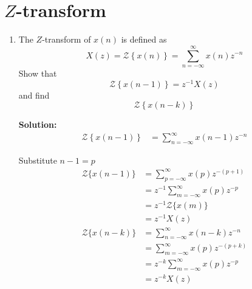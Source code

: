 \documentclass[journal,12pt,twocolumn]{IEEEtran}
\newcommand{\solution}{\noindent \textbf{Solution: }}
\providecommand{\brak}[1]{\ensuremath{\left(#1\right)}}
\providecommand{\cbrak}[1]{\ensuremath{\left\{#1\right\}}}
\numberwithin{equation}{section}
\renewcommand\thesection{\arabic{section}}
\begin{document}
	\section{$Z$-transform}
	\begin{enumerate}[label=\thesection.\arabic*]
	\item The $Z$-transform of $x\brak{n}$ is defined as
	\begin{equation}
		X\brak{z}={\mathcal{Z}}\cbrak{x\brak{n}}=\sum _{n=-\infty }^{\infty }x(n)z^{-n}
	\end{equation}
	Show that
	\begin{equation}
		{\mathcal{Z}}\cbrak{x\brak{n-1}} = z^{-1}X\brak{z}
	\end{equation}
	and find
	\begin{equation}
		{\mathcal{Z}}\cbrak{x\brak{n-k}}
	\end{equation}
	
	\solution 
	\begin{align}
		{\mathcal{Z}}\cbrak{x\brak{n-1}} &= \sum _{n=-\infty }^{\infty }x\brak{n-1}z^{-n} 
	\end{align}
	
	Substitute $n - 1 = p$
	\begin{align}
		{\mathcal {Z}}\{x(n-1)\} &=  \sum _{p=-\infty }^{\infty }x(p)z^{-(p+1)} \\
		&= z^{-1} \sum _{m=-\infty }^{\infty }x(p)z^{-p} \\
		&= z^{-1} {\mathcal {Z}}\{x(m)\} \\	
		&= z^{-1} X(z) \\
		{\mathcal {Z}}\{x(n-k)\} &=  \sum _{n=-\infty }^{\infty }x(n - k)z^{-n} \\
		&=  \sum _{m=-\infty }^{\infty }x(p)z^{-(p+k)} \\
		&= z^{-k} \sum _{m=-\infty }^{\infty }x(p)z^{-p} \\
		&= z^{-k} X(z)
	\end{align}	
	

	\end{enumerate}
	
	
\end{document}
